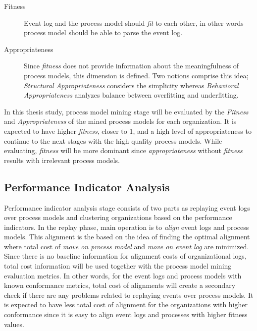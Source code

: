 \begin{description}
  \item[Fitness] Event log and the process model should \textit{fit} to each other, in other words process model should be able to parse the event log. 
  \item[Appropriateness] Since \textit{fitness} does not provide information about the meaningfulness of process models, this dimension is defined. Two notions comprise this idea; \textit{Structural Appropriateness} considers the simplicity whereas \textit{Behavioral Appropriateness} analyzes balance between overfitting and underfitting.
\end{description}

In this thesis study, process model mining stage will be evaluated by the \textit{Fitness} and \textit{Appropriateness} of the mined process models for each organization. It is expected to have higher \textit{fitness}, closer to 1, and a high level of appropriateness to continue to the next stages with the high quality process models. While evaluating, \textit{fitness} will be more dominant since \textit{appropriateness} without \textit{fitness} results with irrelevant process models.
\subsection{Performance Indicator Analysis}
\label{subsec:performance-indicator-analysis-eval}
Performance indicator analysis stage consists of two parts as replaying event logs over process models and clustering organizations based on the performance indicators. In the replay phase, main operation is to \textit{align} \cite{van2012replaying} event logs and process models. This alignment is the based on the idea of finding the optimal alignment where total cost of \textit{move on process model} and \textit{move on event log} are minimized. Since there is no baseline information for alignment costs of organizational logs, total cost information will be used together with the process model mining evaluation metrics. In other words, for the event logs and process models with known conformance metrics, total cost of alignments will create a secondary check if there are any problems related to replaying events over process models. It is expected to have less total cost of alignment for the organizations with higher conformance since it is easy to align event logs and processes with higher fitness values.

